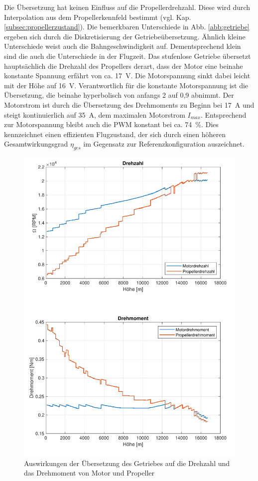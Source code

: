 Die Übersetzung hat keinen Einfluss auf die Propellerdrehzahl. Diese wird durch Interpolation aus dem Propellerkennfeld bestimmt (vgl. Kap. \ref{subsec:propellerzustand}). Die bemerkbaren Unterschiede in Abb. \ref{abb:getriebe} ergeben sich durch die Diskretisierung der Getriebeübersetzung.
Ähnlich kleine Unterschiede weist auch die Bahngeschwindigkeit auf. Dementsprechend klein sind die auch die Unterschiede in der Flugzeit. Das stufenlose Getriebe übersetzt hauptsächlich die Drehzahl des Propellers derart, dass der Motor eine beinahe konstante Spannung erfährt von ca. \SI{17}{V}. Die Motorspannung sinkt dabei leicht mit der Höhe auf \SI{16}{V}. Verantwortlich für die konstante Motorspannung ist die Übersetzung, die beinahe hyperbolisch von anfangs 2 auf 0,9 abnimmt. Der Motorstrom ist durch die Übersetzung des Drehmoments zu Beginn bei \SI{17}{A} und steigt kontinuierlich auf \SI{35}{A}, dem maximalen Motorstrom \ensuremath{I_{max}}. Entsprechend zur Motorspannung bleibt auch die PWM konstant bei ca. \SI{74}{\%}. Dies kennzeichnet einen effizienten Flugzustand, der sich durch einen höheren Gesamtwirkungsgrad \ensuremath{\eta_{ges}} im Gegensatz zur Referenzkonfiguration auszeichnet.

\begin{figure}[H]
\centering
	\includegraphics[scale=0.5]{Diagramme/Drehzahl_und_Drehmoment.pdf}
	\caption{Auswirkungen der Übersetzung des Getriebes auf die Drehzahl und das Drehmoment von Motor und Propeller}
	\label{abb:getriebe_dud}
\end{figure}

